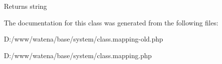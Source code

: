 \begin{DoxyReturn}{Returns}
string 
\end{DoxyReturn}


The documentation for this class was generated from the following files\-:\begin{DoxyCompactItemize}
\item 
D\-:/www/watena/base/system/class.\-mapping-\/old.\-php\item 
D\-:/www/watena/base/system/class.\-mapping.\-php\end{DoxyCompactItemize}
